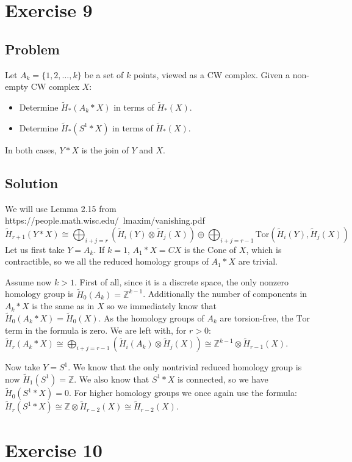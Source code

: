 \documentclass{article}
\begin{document}
\section*{Exercise 9}
\subsection*{Problem}
Let $A_k = \{1, 2, \dots , k \}$ be a set of $k$ points, viewed as a CW complex. Given a
non-empty CW complex $X$:
\begin{itemize}
\item Determine $\tilde{H}_* (A_k * X)$ in terms of $\tilde{H}_* (X)$.
\item Determine $\tilde{H}_* (S^1 * X)$ in terms of $\tilde{H}_* (X)$.
\end{itemize}
In both cases, $Y * X$ is the join of $Y$ and $X$.
\subsection*{Solution}
We will use Lemma 2.15 from https://people.math.wisc.edu/~lmaxim/vanishing.pdf
\begin{equation*}
\tilde{H}_{r+1}(Y*X) \cong \bigoplus_{i+j = r} \left( \tilde{H}_i(Y) \otimes \tilde{H}_j (X) \right) \oplus \bigoplus_{i+j=r-1} \mathrm{Tor}(\tilde{H}_i(Y), \tilde{H}_j(X))
\end{equation*}
Let us first take $Y = A_k$. If $k=1$, $A_1 * X = CX$ is the Cone of $X$, which is contractible, so we all the reduced homology groups of $A_1 * X$ are trivial.

Assume now $k>1$. First of all, since it is a discrete space, the only nonzero homology group is $\tilde{H}_0(A_k) = \mathbb{Z}^{k-1}$.
Additionally the number of components in $A_k * X$ is the same as in $X$ so we immediately know that $\tilde{H}_0(A_k * X) = \tilde{H}_0(X)$.
As the homology groups of $A_k$ are torsion-free, the $\mathrm{Tor}$ term in the formula is zero. We are left with, for $r>0$:
$\tilde{H}_r(A_k * X) \cong \bigoplus_{i+j = r-1} \left( \tilde{H}_i(A_k) \otimes \tilde{H}_j (X) \right) \cong \mathbb{Z}^{k-1} \otimes \tilde{H}_{r-1}(X)$.

Now take $Y=S^1$. We know that the only nontrivial reduced homology group is now $\tilde{H}_1(S^1) = \mathbb{Z}$.
We also know that $S^1 * X$ is connected, so we have $\tilde{H}_0(S^1 * X) = 0$.
For higher homology groups we once again use the formula:
$\tilde{H}_r(S^1 * X)  \cong \mathbb{Z} \otimes \tilde{H}_{r-2}(X) \cong \tilde{H}_{r-2}(X)$.
\section*{Exercise 10}
\end{document}
